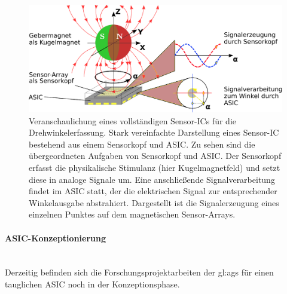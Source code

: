 \clearpage


\begin{figure}[tbph]
	\centering
	\includegraphics[width=\linewidth]{chapters/images/Veranschaulichung_Sensor-IC}
	\caption[Veranschaulichung eines vollständigen Sensor-ICs für die Drehwinkelerfassung]{Veranschaulichung eines vollständigen Sensor-ICs für die Drehwinkelerfassung. Stark vereinfachte Darstellung eines Sensor-IC bestehend aus einem Sensorkopf und ASIC. Zu sehen sind die übergeordneten Aufgaben von Sensorkopf und ASIC. Der Sensorkopf erfasst die physikalische Stimulanz (hier Kugelmagnetfeld) und setzt diese in analoge Signale um. Eine anschließende Signalverarbeitung findet im ASIC statt, der die elektrischen Signal zur entsprechender Winkelausgabe abstrahiert. Dargestellt ist die Signalerzeugung eines einzelnen Punktes auf dem magnetischen Sensor-Arrays.}
	\label{fig:veranschaulichung-sensor-ic}
\end{figure}


\paragraph{ASIC-Konzeptionierung}\label{par:asic-konzeptionierung}$~$\\


Derzeitig befinden sich die Forschungsprojektarbeiten der \gls{gl:ags} für einen tauglichen ASIC noch in der Konzeptionsphase. \cite{Rasmussen2006}\cite{Schuethe2019}\cite{Schuethe2020}